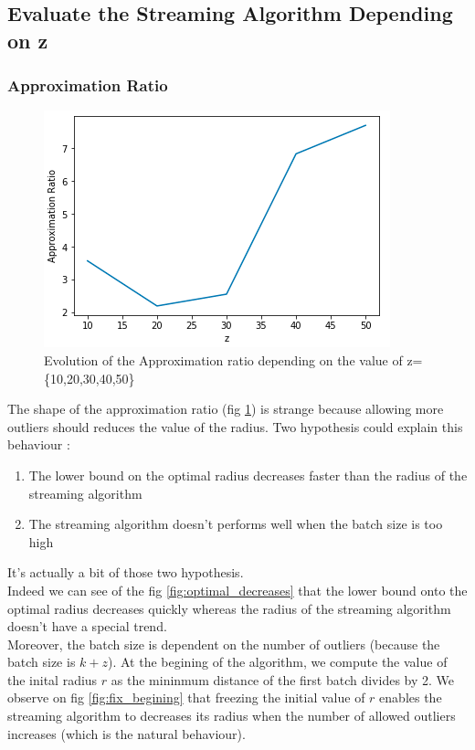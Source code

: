 \documentclass[a4paper,11pt,openany]{article}
\begin{document}
\subsection*{Evaluate the Streaming Algorithm Depending on z}
\subsubsection*{Approximation Ratio}
\begin{figure}[H]
\begin{center}
\includegraphics[scale=0.7]{Images/approx_ratio}
\caption{Evolution of the Approximation ratio depending on the value of z=\{10,20,30,40,50\}}
\label{fig:approx_ratio}
\end{center}
\end{figure}
\noindent
The shape of the approximation ratio (fig \ref{fig:approx_ratio}) is strange because allowing more outliers should reduces the value of the radius. Two hypothesis could explain this behaviour : 
\begin{enumerate}
\item The lower bound on the optimal radius decreases faster than the radius of the streaming algorithm
\item The streaming algorithm doesn't performs well when the batch size is too high
\end{enumerate}
It's actually a bit of those two hypothesis.\\
Indeed we can see of the fig \ref{fig:optimal_decreases} that the lower bound onto the optimal radius decreases quickly whereas the radius of the streaming algorithm doesn't have a special trend.\\
Moreover, the batch size is dependent on the number of outliers (because the batch size is $k+z$). At the begining of the algorithm, we compute the value of the inital radius $r$ as the mininmum distance of the first batch divides by 2. We observe on fig \ref{fig:fix_begining} that freezing the initial value of $r$ enables the streaming algorithm to decreases its radius when the number of allowed outliers increases (which is the natural behaviour).
\end{document}
